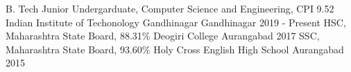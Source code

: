 


\begin{cventries}


\cventry
{B. Tech Junior Undergarduate, Computer Science and Engineering, CPI 9.52} %
{Indian Institute of Techonology Gandhinagar} %
{Gandhinagar} %
{2019 - Present}
{} %
\cventry
{HSC, Maharashtra State Board, 88.31\%} %
{Deogiri College} %
{Aurangabad} %
{2017} %
{}
\cventry
{SSC, Maharashtra State Board, 93.60\%} %
{Holy Cross English High School} %
{Aurangabad} %
{2015} %
{}

\end{cventries}